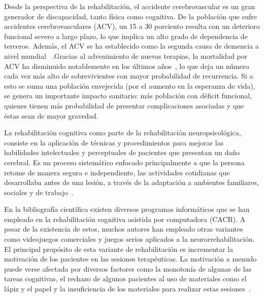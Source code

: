 \begin{introduction}
    Desde la perspectiva de la rehabilitación, el accidente cerebrovascular 
    es un gran generador de discapacidad, tanto física como cognitiva. De la población que sufre 
    accidentes cerebrovasculares (ACV), un 15 a 30 porciento resulta con un deterioro funcional severo a 
    largo plazo, lo que implica un alto grado de dependencia de terceros. Además, el ACV se ha
    establecido como la segunda causa de demencia a nivel mundial~\cite{moyano2010accidente} .Gracias 
    al advenimiento de nuevas terapias, la mortalidad por ACV ha disminuido notablemente en los últimos 
    años~\cite{cuadrado2009rehabilitacion,harold2007guidelines}, lo que deja un número cada vez más 
    alto de sobrevivientes con mayor probabilidad de recurrencia. Si a esto se suma una población 
    envejecida (por el aumento en la esperanza de vida), se genera un importante impacto sanitario: 
    más población con déficit funcional, quienes tienen más probabilidad de presentar complicaciones 
    asociadas y que éstas sean de mayor gravedad.

    \vspace{5pt}
    La rehabilitación cognitiva como parte de la rehabilitación neuropsicológica, consiste en la 
    aplicación de técnicas y procedimientos para mejorar las habilidades intelectuales y perceptuales 
    de pacientes que presentan un daño cerebral. Es un proceso sistemático enfocado principalmente a 
    que la persona retome de manera segura e independiente, las actividades cotidianas que desarrollaba 
    antes de una lesión, a través de la adaptación a ambientes familiares, sociales y de trabajo~\cite{regalon12019juegos}.
    
    \vspace{5pt}
    En la bibliografía científica existen diversos programas informáticos que se han empleado en la 
    rehabilitación cognitiva asistida por computadora (CACR). A pesar de la existencia de estos, muchos 
    autores han empleado otras variantes como videojuegos comerciales y juegos serios aplicados a la 
    neurorrehabilitación. El principal propósito de esta variante de rehabilitación es incrementar la 
    motivación de los pacientes en las sesiones terapéuticas. La motivación a menudo puede verse afectada 
    por diversos factores como la monotonía de algunas de las tareas cognitivas, el rechazo de algunos 
    pacientes al uso de materiales como el lápiz y el papel y la insuficiencia de los materiales para 
    realizar estas sesiones~\cite{regalon12019juegos}. 
    

\end{introduction}
